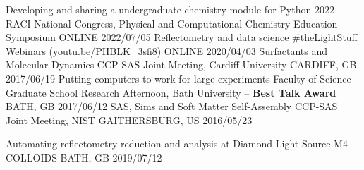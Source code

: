 \vspace{-0.4cm}
\begin{cvhonors}
  \cvhonor
    {Developing and sharing a undergraduate chemistry module for Python}
    {2022 RACI National Congress, Physical and Computational Chemistry Education Symposium}
    {ONLINE}
    {2022/07/05}
  \cvhonor
    {Reflectometry and data science}
    {\#theLightStuff Webinars (\href{https://youtu.be/PHBLK_3sfi8}{youtu.be/PHBLK\_3sfi8})}
    {ONLINE}
    {2020/04/03}
  \cvhonor
    {Surfactants and Molecular Dynamics}
    {CCP-SAS Joint Meeting, Cardiff University}
    {CARDIFF, GB}
    {2017/06/19}
  \cvhonor
    {Putting computers to work for large experiments}
    {Faculty of Science Graduate School Research Afternoon, Bath University -- \textbf{Best Talk Award}}
    {BATH, GB}
    {2017/06/12}
  \cvhonor
    {SAS, Sims and Soft Matter Self-Assembly}
    {CCP-SAS Joint Meeting, NIST}
    {GAITHERSBURG, US}
    {2016/05/23}
\end{cvhonors}
\begin{cvhonors}
  \cvhonor
    {Automating reflectometry reduction and analysis at Diamond Light Source}
    {M4 COLLOIDS}
    {BATH, GB}
    {2019/07/12}
\end{cvhonors}
